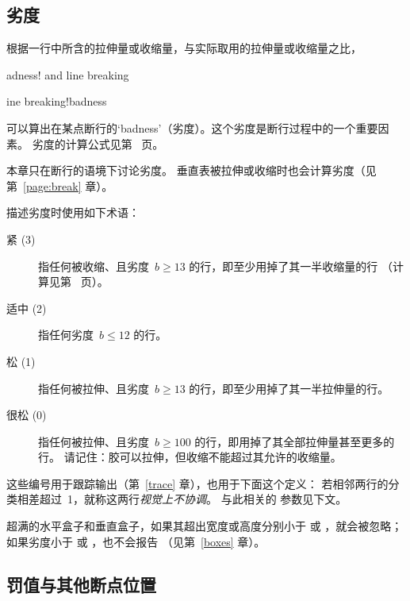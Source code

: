 \documentclass[a4paper]{rapport3}
\def\term#1\par{\index{#1}}
\begin{document}
\subsection{劣度}

根据一行中所含的拉伸量或收缩量，与实际取用的拉伸量或收缩量之比，
\term badness! and line breaking\par\term  line breaking!badness\par
可以算出在某点断行的`badness'（劣度）。这个劣度是断行过程中的一个重要因素。
劣度的计算公式见第~\pageref{bad:form} 页。

本章只在断行的语境下讨论劣度。
垂直表被拉伸或收缩时也会计算劣度（见第~\ref{page:break} 章）。 

描述劣度时使用如下术语：
\begin{description} \item [紧 (3)]
指任何被收缩、且劣度~$b\geq13$ 的行，即至少用掉了其一半收缩量的行
（计算见第~\pageref{bad:form} 页）。
\item [适中 (2)]
指任何劣度~$b\leq12$ 的行。
\item [松 (1)]
指任何被拉伸、且劣度~$b\geq13$ 的行，即至少用掉了其一半拉伸量的行。
\item [很松 (0)]
指任何被拉伸、且劣度~$b\geq100$ 的行，即用掉了其全部拉伸量甚至更多的行。
请记住：胶可以拉伸，但收缩不能超过其允许的收缩量。
\end{description}
这些编号用于跟踪输出（第~\ref{trace} 章），也用于下面这个定义：
若相邻两行的分类相差超过~1，就称这两行{\em 视觉上不协调\/}。
与此相关的  参数见下文。

超满的水平盒子和垂直盒子，如果其超出宽度或高度分别小于
 或 ，就会被忽略；
如果劣度小于  或 ，也不会报告
（见第~\ref{boxes} 章）。

\subsection{罚值与其他断点位置}
 
\end{document}
